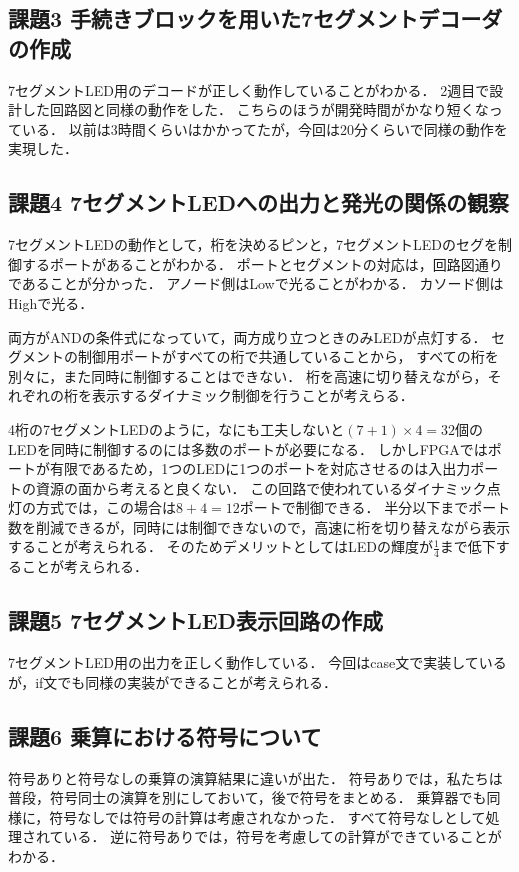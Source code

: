 \subsection{課題3 手続きブロックを用いた7セグメントデコーダの作成}
7セグメントLED用のデコードが正しく動作していることがわかる．
2週目で設計した回路図と同様の動作をした．
こちらのほうが開発時間がかなり短くなっている．
以前は3時間くらいはかかってたが，今回は20分くらいで同様の動作を実現した．

\subsection{課題4 7セグメントLEDへの出力と発光の関係の観察}
7セグメントLEDの動作として，桁を決めるピンと，7セグメントLEDのセグを制御するポートがあることがわかる．
ポートとセグメントの対応は，回路図通りであることが分かった．
アノード側はLowで光ることがわかる．
カソード側はHighで光る．

両方がANDの条件式になっていて，両方成り立つときのみLEDが点灯する．
セグメントの制御用ポートがすべての桁で共通していることから，
すべての桁を別々に，また同時に制御することはできない．
桁を高速に切り替えながら，それぞれの桁を表示するダイナミック制御を行うことが考えらる．

4桁の7セグメントLEDのように，なにも工夫しないと$(7+1)\times4=32$個のLEDを同時に制御するのには多数のポートが必要になる．
しかしFPGAではポートが有限であるため，1つのLEDに1つのポートを対応させるのは入出力ポートの資源の面から考えると良くない．
この回路で使われているダイナミック点灯の方式では，この場合は$8+4=12$ポートで制御できる．
半分以下までポート数を削減できるが，同時には制御できないので，高速に桁を切り替えながら表示することが考えられる．
そのためデメリットとしてはLEDの輝度が$\frac{1}{4}$まで低下することが考えられる．

\subsection{課題5 7セグメントLED表示回路の作成}
7セグメントLED用の出力を正しく動作している．
今回はcase文で実装しているが，if文でも同様の実装ができることが考えられる．

\subsection{課題6 乗算における符号について}
符号ありと符号なしの乗算の演算結果に違いが出た．
符号ありでは，私たちは普段，符号同士の演算を別にしておいて，後で符号をまとめる．
乗算器でも同様に，符号なしでは符号の計算は考慮されなかった．
すべて符号なしとして処理されている．
逆に符号ありでは，符号を考慮しての計算ができていることがわかる．

